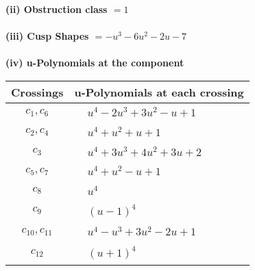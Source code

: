 \documentclass[1p]{elsarticle_modified}
\theoremstyle{definition}
\begin{document}
\flushleft \textbf{(ii) Obstruction class $= 1$}\\~\\
\flushleft \textbf{(iii) Cusp Shapes $= - u^3-6 u^2-2 u-7$}\\~\\
\newpage\renewcommand{\arraystretch}{1}
\flushleft \textbf{(iv) u-Polynomials at the component}\newline \\
\begin{tabular}{m{50pt}|m{274pt}}
Crossings & \hspace{64pt}u-Polynomials at each crossing \\
\hline $$\begin{aligned}c_{1},c_{6}\end{aligned}$$&$\begin{aligned}
&u^4-2 u^3+3 u^2- u+1
\end{aligned}$\\
\hline $$\begin{aligned}c_{2},c_{4}\end{aligned}$$&$\begin{aligned}
&u^4+u^2+u+1
\end{aligned}$\\
\hline $$\begin{aligned}c_{3}\end{aligned}$$&$\begin{aligned}
&u^4+3 u^3+4 u^2+3 u+2
\end{aligned}$\\
\hline $$\begin{aligned}c_{5},c_{7}\end{aligned}$$&$\begin{aligned}
&u^4+u^2- u+1
\end{aligned}$\\
\hline $$\begin{aligned}c_{8}\end{aligned}$$&$\begin{aligned}
&u^4
\end{aligned}$\\
\hline $$\begin{aligned}c_{9}\end{aligned}$$&$\begin{aligned}
&(u-1)^4
\end{aligned}$\\
\hline $$\begin{aligned}c_{10},c_{11}\end{aligned}$$&$\begin{aligned}
&u^4- u^3+3 u^2-2 u+1
\end{aligned}$\\
\hline $$\begin{aligned}c_{12}\end{aligned}$$&$\begin{aligned}
&(u+1)^4
\end{aligned}$\\
\hline
\end{tabular}\\~\\
\end{document}
